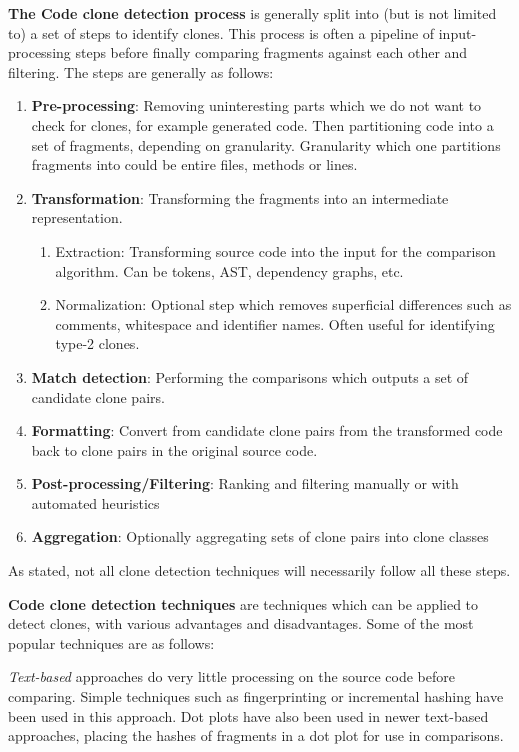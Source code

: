 \documentclass[12pt]{article}
\begin{document}
\textbf{The Code clone detection process} is generally split into (but is not limited to)
a set of steps to identify clones\cite{ComparisonAndEvaluationOfTechniques}. This
process is often a pipeline of input-processing steps before finally comparing fragments
against each other and filtering. The steps are generally as follows:

\begin{enumerate}
    \item \textbf{Pre-processing}: Removing uninteresting parts which we do not want to
        check for clones, for example generated code. Then partitioning code into a set of
        fragments, depending on granularity. Granularity which one partitions fragments
        into could be entire files, methods or lines.
	\item \textbf{Transformation}: Transforming the fragments into an intermediate representation.
	      \begin{enumerate}
		      \item Extraction: Transforming source code into the input for the comparison
		            algorithm. Can be tokens, AST, dependency graphs, etc.
		      \item Normalization: Optional step which removes superficial differences such as
		            comments, whitespace and identifier names. Often useful for identifying type-2
		            clones.
	      \end{enumerate}
	\item \textbf{Match detection}: Performing the comparisons which outputs a set of
	      candidate clone pairs.
	\item \textbf{Formatting}: Convert from candidate clone pairs from the transformed
	      code back to clone pairs in the original source code.
	\item \textbf{Post-processing/Filtering}: Ranking and filtering manually or with
	      automated heuristics
	\item \textbf{Aggregation}: Optionally aggregating sets of clone pairs into clone classes
\end{enumerate}

As stated, not all clone detection techniques will necessarily follow all these steps.

\textbf{Code clone detection techniques} are techniques which can be applied to detect
clones, with various advantages and disadvantages. Some of the most popular techniques are
as follows:

\textit{Text-based} approaches do very little processing on the source code before
comparing. Simple techniques such as fingerprinting or incremental hashing have been used
in this approach. Dot plots have also been used in newer text-based approaches, placing
the hashes of fragments in a dot plot for use in comparisons.
\end{document}
